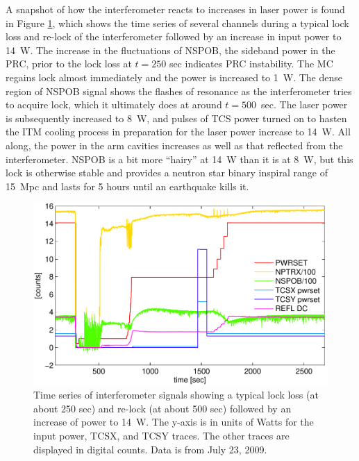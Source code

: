A snapshot of how the interferometer reacts to increases in laser
power is found in Figure \ref{fig:striptool}, which shows the time
series of several channels during a typical lock loss and re-lock of
the interferometer followed by an increase in input power to 14~W. The
increase in the fluctuations of NSPOB, the sideband power in the PRC,
prior to the lock loss at $t=250$ sec indicates PRC instability. The
MC regains lock almost immediately and the power is increased to
1~W. The dense region of NSPOB signal shows the flashes of resonance
as the interferometer tries to acquire lock, which it ultimately does
at around $t=500$~sec. The laser power is subsequently increased to
8~W, and pulses of TCS power turned on to hasten the ITM cooling
process in preparation for the laser power increase to 14~W. All
along, the power in the arm cavities increases as well as that
reflected from the interferometer. NSPOB is a bit more ``hairy'' at
14~W than it is at 8~W, but this lock is otherwise stable and provides
a neutron star binary inspiral range of 15~Mpc and lasts for 5 hours
until an earthquake kills it.

\begin{figure}
\begin{centering}
\includegraphics[width=1.0\columnwidth]{figures/timeseries_ifolocked.pdf}
\caption[Time series of interferometer signals showing a typical lock
loss and re-lock followed by an increase of power to 14~W]{Time series
  of interferometer signals showing a typical lock loss (at about 250
  sec) and re-lock (at about 500 sec) followed by an increase of power
  to 14~W. The y-axis is in units of Watts for the input power, TCSX,
  and TCSY traces. The other traces are displayed in digital
  counts. Data is from July 23, 2009.}
\label{fig:striptool}
\end{centering}
\end{figure}

